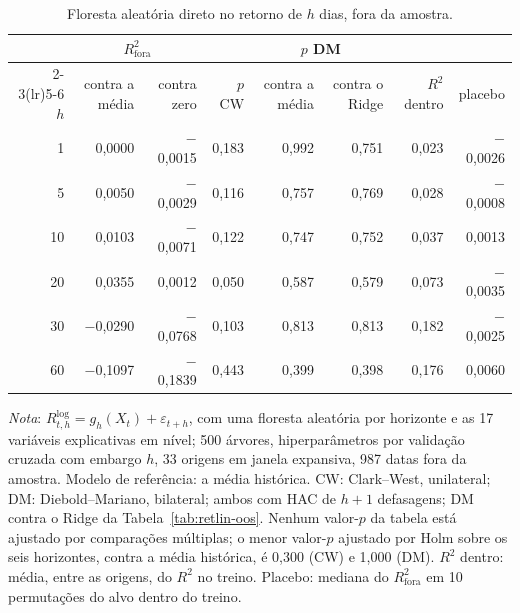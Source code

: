 \begin{table}[H]
\centering
\footnotesize
\caption{Floresta aleatória direto no retorno de $h$ dias, fora da amostra.}
\label{tab:retnl-oos-floresta}
\begin{tabular}{rrrrrrrr}
\toprule
 & \multicolumn{2}{c}{$R^2_{\text{fora}}$} & & \multicolumn{2}{c}{$p$ DM} & & \\ \cmidrule(lr){2-3}\cmidrule(lr){5-6}
$h$ & contra a média & contra zero & $p$ CW & contra a média & contra o Ridge & $R^2$ dentro & placebo \\
\midrule
1 & 0{,}0000 & $-$0{,}0015 & 0{,}183 & 0{,}992 & 0{,}751 & 0{,}023 & $-$0{,}0026 \\
5 & 0{,}0050 & $-$0{,}0029 & 0{,}116 & 0{,}757 & 0{,}769 & 0{,}028 & $-$0{,}0008 \\
10 & 0{,}0103 & $-$0{,}0071 & 0{,}122 & 0{,}747 & 0{,}752 & 0{,}037 & 0{,}0013 \\
20 & 0{,}0355 & 0{,}0012 & 0{,}050 & 0{,}587 & 0{,}579 & 0{,}073 & $-$0{,}0035 \\
30 & $-$0{,}0290 & $-$0{,}0768 & 0{,}103 & 0{,}813 & 0{,}813 & 0{,}182 & $-$0{,}0025 \\
60 & $-$0{,}1097 & $-$0{,}1839 & 0{,}443 & 0{,}399 & 0{,}398 & 0{,}176 & 0{,}0060 \\
\bottomrule
\end{tabular}
\par\smallskip
\parbox{0.95\linewidth}{\footnotesize\textit{Nota}: $R^{\log}_{t,h} = g_h(X_t) + \varepsilon_{t+h}$, com uma floresta aleatória por horizonte e as 17 variáveis explicativas em nível; 500 árvores, hiperparâmetros por validação cruzada com embargo $h$, 33 origens em janela expansiva, 987 datas fora da amostra. Modelo de referência: a média histórica. CW: Clark--West, unilateral; DM: Diebold--Mariano, bilateral; ambos com HAC de $h+1$ defasagens; DM contra o Ridge da Tabela~\ref{tab:retlin-oos}. Nenhum valor-$p$ da tabela está ajustado por comparações múltiplas; o menor valor-$p$ ajustado por Holm sobre os seis horizontes, contra a média histórica, é 0{,}300 (CW) e 1{,}000 (DM). $R^2$ dentro: média, entre as origens, do $R^2$ no treino. Placebo: mediana do $R^2_{\text{fora}}$ em 10 permutações do alvo dentro do treino.}
\end{table}
